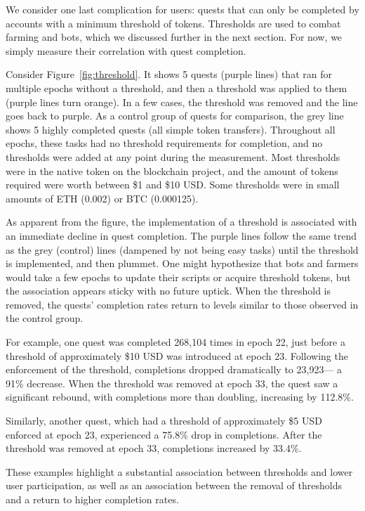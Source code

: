 We consider one last complication for users: quests that can only be completed by accounts with a minimum threshold of tokens. Thresholds are used to combat farming and bots, which we discussed further in the next section. For now, we simply measure their correlation with quest completion. 

Consider Figure~\ref{fig:threshold}. It shows 5 quests (purple lines) that ran for multiple epochs without a threshold, and then a threshold was applied to them (purple lines turn orange). In a few cases, the threshold was removed and the line goes back to purple. As a control group of quests for comparison, the grey line shows 5 highly completed quests (all simple token transfers). Throughout all epochs, these tasks had no threshold requirements for completion, and no thresholds were added at any point during the measurement. Most thresholds were in the native token on the blockchain project, and the amount of tokens required were worth between \$1 and \$10 USD. Some thresholds were in small amounts of ETH (0.002) or BTC (0.000125). 

As apparent from the figure, the implementation of a threshold is associated with an immediate decline in quest completion. The purple lines follow the same trend as the grey (control) lines (dampened by not being easy tasks) until the threshold is implemented, and then plummet. One might hypothesize that bots and farmers would take a few epochs to update their scripts or acquire threshold tokens, but the association appears sticky with no future uptick. When the threshold is removed, the quests' completion rates return to levels similar to those observed in the control group.

For example, one quest was completed 268,104 times in epoch 22, just before a threshold of approximately \$10 USD was introduced at epoch 23. Following the enforcement of the threshold, completions dropped dramatically to 23,923— a 91\% decrease. When the threshold was removed at epoch 33, the quest saw a significant rebound, with completions more than doubling, increasing by 112.8\%.

Similarly, another quest, which had a threshold of approximately \$5 USD enforced at epoch 23, experienced a 75.8\% drop in completions. After the threshold was removed at epoch 33, completions increased by 33.4\%. 

These examples highlight a substantial association between thresholds and lower user participation, as well as an association between the removal of thresholds and a return to higher completion rates.


